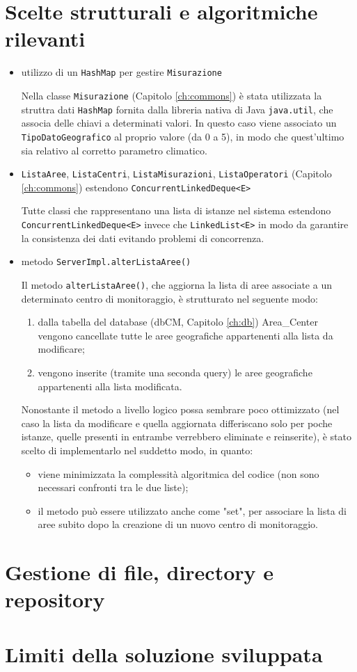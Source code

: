 \chapter{Scelte strutturali e algoritmiche rilevanti}
\begin{itemize}
	\item utilizzo di un \texttt{HashMap} per gestire \texttt{Misurazione}
	
	Nella classe \texttt{Misurazione} (Capitolo \ref{ch:commons}) è stata utilizzata la struttra dati \texttt{HashMap} fornita dalla libreria nativa di Java \texttt{java.util}, che associa delle chiavi a determinati valori. In questo caso viene associato un \texttt{TipoDatoGeografico} al proprio valore (da 0 a 5), in modo che quest'ultimo sia relativo al corretto parametro climatico.
	
	\item \texttt{ListaAree}, \texttt{ListaCentri}, \texttt{ListaMisurazioni}, \texttt{ListaOperatori} (Capitolo \ref{ch:commons}) estendono \texttt{ConcurrentLinkedDeque<E>}
	
	Tutte classi che rappresentano una lista di istanze nel sistema estendono \texttt{ConcurrentLinkedDeque<E>} invece che \texttt{LinkedList<E>} in modo da garantire la consistenza dei dati evitando problemi di concorrenza.
	
	\item metodo \texttt{ServerImpl.alterListaAree()}
	
	Il metodo \texttt{alterListaAree()}, che aggiorna la lista di aree associate a un determinato centro di monitoraggio, è strutturato nel seguente modo:
	\begin{enumerate}
		\item dalla tabella del database (dbCM, Capitolo \ref{ch:db}) Area\_Center vengono cancellate tutte le aree geografiche appartenenti alla lista da modificare;
		\item vengono inserite (tramite una seconda query) le aree geografiche appartenenti alla lista modificata.
	\end{enumerate}
	
	Nonostante il metodo a livello logico possa sembrare poco ottimizzato (nel caso la lista da modificare e quella aggiornata differiscano solo per poche istanze, quelle presenti in entrambe verrebbero eliminate e reinserite), è stato scelto di implementarlo nel suddetto modo, in quanto: 
	\begin{itemize}
		\item viene minimizzata la complessità algoritmica del codice (non sono necessari confronti tra le due liste);
		\item il metodo può essere utilizzato anche come "set", per associare la lista di aree subito dopo la creazione di un nuovo centro di monitoraggio.
	\end{itemize}
	
\end{itemize}
\chapter{Gestione di file, directory e repository}

\chapter{Limiti della soluzione sviluppata}

\nocite{IuriTex}


